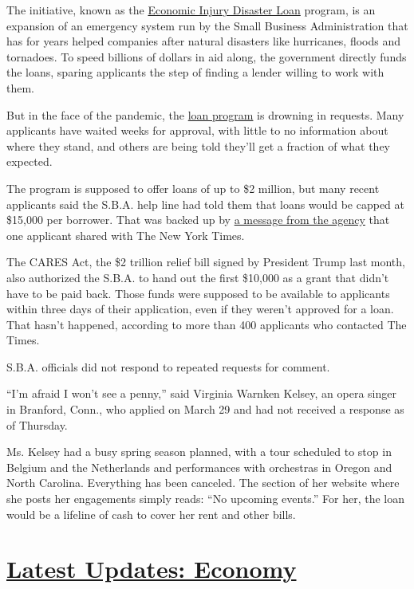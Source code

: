 The initiative, known as the
\href{https://www.sba.gov/funding-programs/loans/coronavirus-relief-options/economic-injury-disaster-loan-emergency-advance}{Economic
Injury Disaster Loan} program, is an expansion of an emergency system
run by the Small Business Administration that has for years helped
companies after natural disasters like hurricanes, floods and tornadoes.
To speed billions of dollars in aid along, the government directly funds
the loans, sparing applicants the step of finding a lender willing to
work with them.

But in the face of the pandemic, the
\href{https://www.nytimes3xbfgragh.onion/2020/04/20/business/shake-shack-returning-loan-ppp-coronavirus.html}{loan
program} is drowning in requests. Many applicants have waited weeks for
approval, with little to no information about where they stand, and
others are being told they'll get a fraction of what they expected.

The program is supposed to offer loans of up to \$2 million, but many
recent applicants said the S.B.A. help line had told them that loans
would be capped at \$15,000 per borrower. That was backed up by
\href{https://int.graylady3jvrrxbe.onion/data/documenthelper/6871-sba-note-about-15000-cap/optimized/full.pdf}{a
message from the agency} that one applicant shared with The New York
Times.

The CARES Act, the \$2 trillion relief bill signed by President Trump
last month, also authorized the S.B.A. to hand out the first \$10,000 as
a grant that didn't have to be paid back. Those funds were supposed to
be available to applicants within three days of their application, even
if they weren't approved for a loan. That hasn't happened, according to
more than 400 applicants who contacted The Times.

S.B.A. officials did not respond to repeated requests for comment.

``I'm afraid I won't see a penny,'' said Virginia Warnken Kelsey, an
opera singer in Branford, Conn., who applied on March 29 and had not
received a response as of Thursday.

Ms. Kelsey had a busy spring season planned, with a tour scheduled to
stop in Belgium and the Netherlands and performances with orchestras in
Oregon and North Carolina. Everything has been canceled. The section of
her website where she posts her engagements simply reads: ``No upcoming
events.'' For her, the loan would be a lifeline of cash to cover her
rent and other bills.

\hypertarget{latest-updates-economy}{%
\section{\texorpdfstring{\href{https://www.nytimes3xbfgragh.onion/live/2020/08/03/business/stock-market-today-coronavirus?action=click\&pgtype=Article\&state=default\&region=MAIN_CONTENT_1\&context=storylines_live_updates}{Latest
Updates:
Economy}}{Latest Updates: Economy}}\label{latest-updates-economy}}

